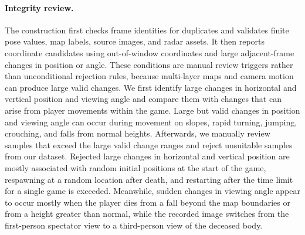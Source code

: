 \paragraph{Integrity review.}
The construction first checks frame identities for duplicates and validates finite pose values, map labels, source images, and radar assets.
It then reports coordinate candidates using out-of-window coordinates and large adjacent-frame changes in position or angle.
These conditions are manual review triggers rather than unconditional rejection rules, because multi-layer maps and camera motion can produce large valid changes.
We first identify large changes in horizontal and vertical position and viewing angle and compare them with changes that can arise from player movements within the game.
Large but valid changes in position and viewing angle can occur during movement on slopes, rapid turning, jumping, crouching, and falls from normal heights.
Afterwards, we manually review samples that exceed the large valid change ranges and reject unsuitable samples from our dataset.
Rejected large changes in horizontal and vertical position are mostly associated with random initial positions at the start of the game, respawning at a random location after death, and restarting after the time limit for a single game is exceeded.
Meanwhile, sudden changes in viewing angle appear to occur mostly when the player dies from a fall beyond the map boundaries or from a height greater than normal, while the recorded image switches from the first-person spectator view to a third-person view of the deceased body.


